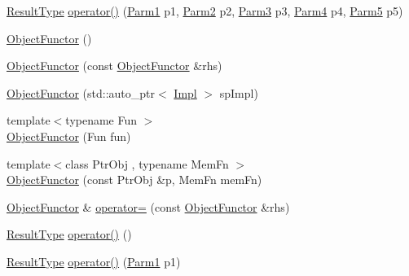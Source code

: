 \begin{DoxyCompactItemize}
\item 
\mbox{\hyperlink{classUtil_1_1ObjectFunctor_a77f816e98108848347d0dfc085090a1c}{Result\+Type}} \mbox{\hyperlink{classUtil_1_1ObjectFunctor_a95b7e08a92f54e2ce8a90153c1414abd}{operator()}} (\mbox{\hyperlink{classUtil_1_1ObjectFunctor_a199715d28029627c2ae7219c13b04d26}{Parm1}} p1, \mbox{\hyperlink{classUtil_1_1ObjectFunctor_a6809cf65883dc7575e01d9b9849649cf}{Parm2}} p2, \mbox{\hyperlink{classUtil_1_1ObjectFunctor_a6becd26610c6091b9ba93cd96f3def66}{Parm3}} p3, \mbox{\hyperlink{classUtil_1_1ObjectFunctor_a54ce0b64981cd7f558ce8eea7df3f1b2}{Parm4}} p4, \mbox{\hyperlink{classUtil_1_1ObjectFunctor_a8428e04dd3fb91bc7f7c518a1771eecb}{Parm5}} p5)
\item 
\mbox{\hyperlink{classUtil_1_1ObjectFunctor_ac08a0820c0cf21a61abb6da3ede541d4}{Object\+Functor}} ()
\item 
\mbox{\hyperlink{classUtil_1_1ObjectFunctor_a2d42842ec3d69b317aaaafd65cd9e2fd}{Object\+Functor}} (const \mbox{\hyperlink{classUtil_1_1ObjectFunctor}{Object\+Functor}} \&rhs)
\item 
\mbox{\hyperlink{classUtil_1_1ObjectFunctor_a60702c933bbfec0d0a0e4459debe21b7}{Object\+Functor}} (std\+::auto\+\_\+ptr$<$ \mbox{\hyperlink{classUtil_1_1ObjectFunctor_a93fc635194d1d2768e73ba87d03abd8d}{Impl}} $>$ sp\+Impl)
\item 
{\footnotesize template$<$typename Fun $>$ }\\\mbox{\hyperlink{classUtil_1_1ObjectFunctor_a8a0c7fe30526a774ce94c7a24af4108d}{Object\+Functor}} (Fun fun)
\item 
{\footnotesize template$<$class Ptr\+Obj , typename Mem\+Fn $>$ }\\\mbox{\hyperlink{classUtil_1_1ObjectFunctor_a346fdbed7070eeafec9270c9a5a766ec}{Object\+Functor}} (const Ptr\+Obj \&p, Mem\+Fn mem\+Fn)
\item 
\mbox{\hyperlink{classUtil_1_1ObjectFunctor}{Object\+Functor}} \& \mbox{\hyperlink{classUtil_1_1ObjectFunctor_a90395c8be24965e154bee2f7813a78e8}{operator=}} (const \mbox{\hyperlink{classUtil_1_1ObjectFunctor}{Object\+Functor}} \&rhs)
\item 
\mbox{\hyperlink{classUtil_1_1ObjectFunctor_a77f816e98108848347d0dfc085090a1c}{Result\+Type}} \mbox{\hyperlink{classUtil_1_1ObjectFunctor_a47ff83bbdf075aefe2ee26aafafd88a1}{operator()}} ()
\item 
\mbox{\hyperlink{classUtil_1_1ObjectFunctor_a77f816e98108848347d0dfc085090a1c}{Result\+Type}} \mbox{\hyperlink{classUtil_1_1ObjectFunctor_affe11b4a42e49e60ac921c2353e3ce18}{operator()}} (\mbox{\hyperlink{classUtil_1_1ObjectFunctor_a199715d28029627c2ae7219c13b04d26}{Parm1}} p1)

\end{DoxyCompactItemize}
